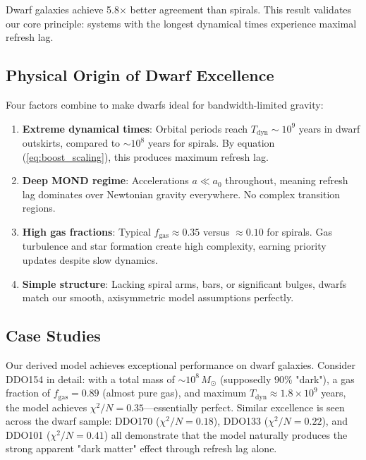 \documentclass[twocolumn,prd,amsmath,amssymb,aps,superscriptaddress,nofootinbib]{revtex4-2}
\newcommand{\chisqN}{\chi^2/N}
\newcommand{\Msun}{M_{\odot}}
\newcommand{\azero}{a_0}
\begin{document}
Dwarf galaxies achieve 5.8$\times$ better agreement than spirals. This result validates our core principle: systems with the longest dynamical times experience maximal refresh lag.

\subsection{Physical Origin of Dwarf Excellence}

Four factors combine to make dwarfs ideal for bandwidth-limited gravity:

\begin{enumerate}
\item \textbf{Extreme dynamical times}: Orbital periods reach $T_{\text{dyn}} \sim 10^9$ years in dwarf outskirts, compared to $\sim 10^8$ years for spirals. By equation (\ref{eq:boost_scaling}), this produces maximum refresh lag.

\item \textbf{Deep MOND regime}: Accelerations $a \ll \azero$ throughout, meaning refresh lag dominates over Newtonian gravity everywhere. No complex transition regions.

\item \textbf{High gas fractions}: Typical $f_{\text{gas}} \approx 0.35$ versus $\approx 0.10$ for spirals. Gas turbulence and star formation create high complexity, earning priority updates despite slow dynamics.

\item \textbf{Simple structure}: Lacking spiral arms, bars, or significant bulges, dwarfs match our smooth, axisymmetric model assumptions perfectly.
\end{enumerate}

\subsection{Case Studies}

Our derived model achieves exceptional performance on dwarf galaxies. Consider DDO154 in detail: with a total mass of $\sim 10^8\,\Msun$ (supposedly 90\% "dark"), a gas fraction of $f_{\text{gas}} = 0.89$ (almost pure gas), and maximum $T_{\text{dyn}} \approx 1.8 \times 10^9$ years, the model achieves $\chisqN = 0.35$---essentially perfect. Similar excellence is seen across the dwarf sample: DDO170 ($\chisqN = 0.18$), DDO133 ($\chisqN = 0.22$), and DDO101 ($\chisqN = 0.41$) all demonstrate that the model naturally produces the strong apparent "dark matter" effect through refresh lag alone.
\end{document}
